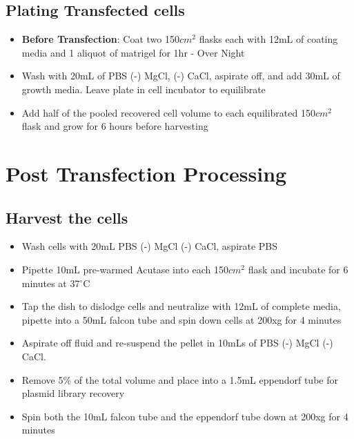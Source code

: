 \documentclass[a4paper]{article}
\begin{document}
    \subsection{Plating Transfected cells}
    	\begin{itemize}
			
            \item \textbf{Before Transfection}: Coat two 150$cm^2$ flasks each with 12mL of coating media and 1 aliquot of matrigel for 1hr - Over Night
            \item Wash with 20mL of PBS (-) MgCl, (-) CaCl, aspirate off, and add 30mL of growth media. Leave plate in cell incubator to equilibrate
            
            \item Add half of the pooled recovered cell volume to each equilibrated 150$cm^2$ flask and grow for 6 hours before harvesting
            
        \end{itemize}
    
\section{Post Transfection Processing}    
	
    \subsection{Harvest the cells}
    	\begin{itemize}
        	\item Wash cells with 20mL PBS (-) MgCl (-) CaCl, aspirate PBS
            
            \item Pipette 10mL pre-warmed Acutase into each 150$cm^2$ flask and incubate for 6 minutes at 37$^{\circ}$C
            
            \item Tap the dish to dislodge cells and neutralize with 12mL of complete media, pipette into a 50mL falcon tube and spin down cells at 200xg for 4 minutes
            
            \item Aspirate off fluid and re-suspend the pellet in 10mLs of PBS (-) MgCl (-) CaCl.
            
            \item Remove 5\% of the total volume and place into a 1.5mL eppendorf tube for plasmid library recovery
            
            \item Spin both the 10mL falcon tube and the eppendorf tube down at 200xg for 4 minutes
        
    	\end{itemize}
    
\end{document}
